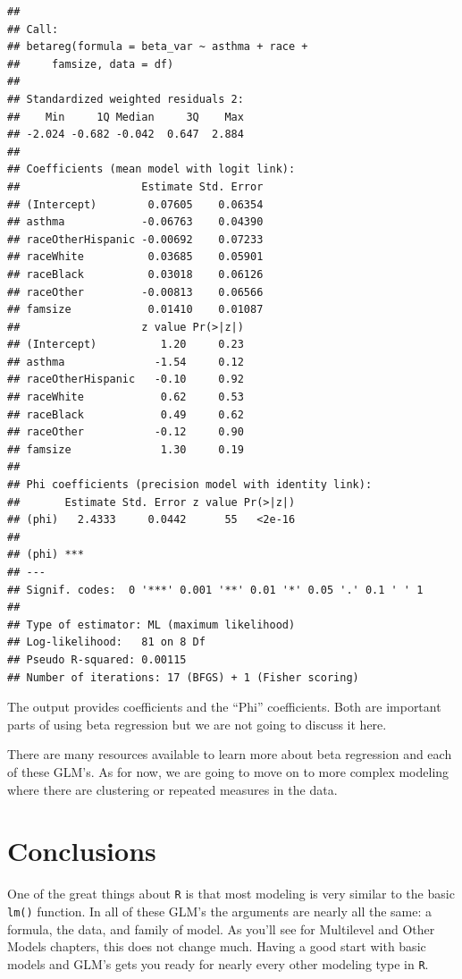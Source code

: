 \documentclass[]{tufte-book}
\theoremstyle{definition}
\theoremstyle{definition}
\theoremstyle{remark}
\begin{document}
\begin{verbatim}
## 
## Call:
## betareg(formula = beta_var ~ asthma + race + 
##     famsize, data = df)
## 
## Standardized weighted residuals 2:
##    Min     1Q Median     3Q    Max 
## -2.024 -0.682 -0.042  0.647  2.884 
## 
## Coefficients (mean model with logit link):
##                   Estimate Std. Error
## (Intercept)        0.07605    0.06354
## asthma            -0.06763    0.04390
## raceOtherHispanic -0.00692    0.07233
## raceWhite          0.03685    0.05901
## raceBlack          0.03018    0.06126
## raceOther         -0.00813    0.06566
## famsize            0.01410    0.01087
##                   z value Pr(>|z|)
## (Intercept)          1.20     0.23
## asthma              -1.54     0.12
## raceOtherHispanic   -0.10     0.92
## raceWhite            0.62     0.53
## raceBlack            0.49     0.62
## raceOther           -0.12     0.90
## famsize              1.30     0.19
## 
## Phi coefficients (precision model with identity link):
##       Estimate Std. Error z value Pr(>|z|)
## (phi)   2.4333     0.0442      55   <2e-16
##          
## (phi) ***
## ---
## Signif. codes:  0 '***' 0.001 '**' 0.01 '*' 0.05 '.' 0.1 ' ' 1 
## 
## Type of estimator: ML (maximum likelihood)
## Log-likelihood:   81 on 8 Df
## Pseudo R-squared: 0.00115
## Number of iterations: 17 (BFGS) + 1 (Fisher scoring)
\end{verbatim}

The output provides coefficients and the ``Phi'' coefficients. Both are
important parts of using beta regression but we are not going to discuss
it here.

There are many resources available to learn more about beta regression
and each of these GLM's. As for now, we are going to move on to more
complex modeling where there are clustering or repeated measures in the
data.

\section*{Conclusions}\label{conclusions-1}

One of the great things about \texttt{R} is that most modeling is very
similar to the basic \texttt{lm()} function. In all of these GLM's the
arguments are nearly all the same: a formula, the data, and family of
model. As you'll see for Multilevel and Other Models chapters, this does
not change much. Having a good start with basic models and GLM's gets
you ready for nearly every other modeling type in \texttt{R}.
\end{document}
